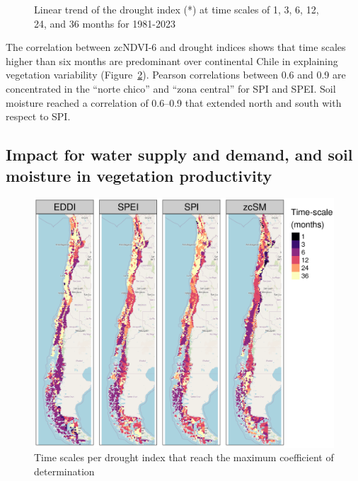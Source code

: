 \documentclass[
  number,
  preprint,
  3p,
  onecolumn]{elsarticle}
\begin{document}
\begin{figure}
\begin{minipage}[t]{0.50\linewidth}
{{}

}

\end{minipage}%

\caption{\label{fig-trendSPI}Linear trend of the drought index (*) at
time scales of 1, 3, 6, 12, 24, and 36 months for 1981-2023}

\end{figure}

\elandscape

The correlation between zcNDVI-6 and drought indices shows that time
scales higher than six months are predominant over continental Chile in
explaining vegetation variability (Figure~\ref{fig-corTimeScale}).
Pearson correlations between 0.6 and 0.9 are concentrated in the ``norte
chico'' and ``zona central'' for SPI and SPEI. Soil moisture reached a
correlation of 0.6--0.9 that extended north and south with respect to
SPI.

\hypertarget{impact-for-water-supply-and-demand-and-soil-moisture-in-vegetation-productivity}{%
\subsection{Impact for water supply and demand, and soil moisture in
vegetation
productivity}\label{impact-for-water-supply-and-demand-and-soil-moisture-in-vegetation-productivity}}

\begin{figure}[!ht]

{\centering \includegraphics{../output/figs/mapa_cor_selec_indices_zcNDVI6.png}

}

\caption{\label{fig-corTimeScale}Time scales per drought index that
reach the maximum coefficient of determination}

\end{figure}
\end{document}
